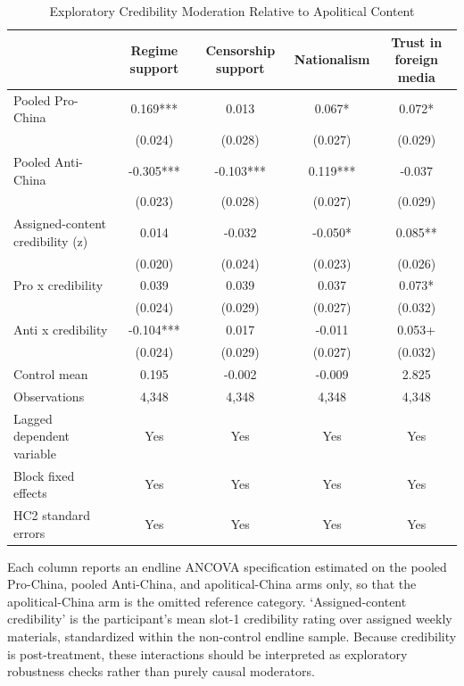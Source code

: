 \begin{table}[H]
\centering
\caption{Exploratory Credibility Moderation Relative to Apolitical Content}
\label{tab:credibility_moderation_t1}
\footnotesize
\begin{threeparttable}
\begin{tabular}{lcccc}
\toprule
 & Regime support & Censorship support & Nationalism & Trust in foreign media \\
\midrule
Pooled Pro-China & 0.169*** & 0.013 & 0.067* & 0.072* \\
 & (0.024) & (0.028) & (0.027) & (0.029) \\
\addlinespace
Pooled Anti-China & -0.305*** & -0.103*** & 0.119*** & -0.037 \\
 & (0.023) & (0.028) & (0.027) & (0.029) \\
\addlinespace
Assigned-content credibility (z) & 0.014 & -0.032 & -0.050* & 0.085** \\
 & (0.020) & (0.024) & (0.023) & (0.026) \\
\addlinespace
Pro x credibility & 0.039 & 0.039 & 0.037 & 0.073* \\
 & (0.024) & (0.029) & (0.027) & (0.032) \\
\addlinespace
Anti x credibility & -0.104*** & 0.017 & -0.011 & 0.053+ \\
 & (0.024) & (0.029) & (0.027) & (0.032) \\
\addlinespace
\midrule
Control mean & 0.195 & -0.002 & -0.009 & 2.825 \\
Observations & 4,348 & 4,348 & 4,348 & 4,348 \\
Lagged dependent variable & Yes & Yes & Yes & Yes \\
Block fixed effects & Yes & Yes & Yes & Yes \\
HC2 standard errors & Yes & Yes & Yes & Yes \\
\bottomrule
\end{tabular}
\begin{tablenotes}[flushleft]
\footnotesize
\item Each column reports an endline ANCOVA specification estimated on the pooled Pro-China, pooled Anti-China, and apolitical-China arms only, so that the apolitical-China arm is the omitted reference category. `Assigned-content credibility' is the participant's mean slot-1 credibility rating over assigned weekly materials, standardized within the non-control endline sample. Because credibility is post-treatment, these interactions should be interpreted as exploratory robustness checks rather than purely causal moderators.
\end{tablenotes}
\end{threeparttable}
\end{table}
